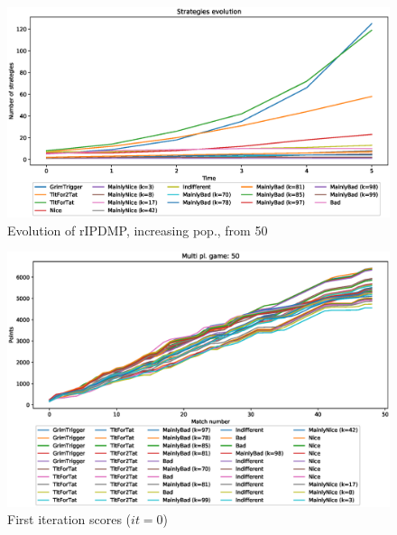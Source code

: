 \documentclass[journal,10pt,twoside]{IEEEtran}
\begin{document}
\begin{figure}[!ht]
    \centering
    \includegraphics[width=1\columnwidth]{../img/ripdmp-incr/alt1/ripdmp-evolution-increasing-pop-50}
    \caption{Evolution of rIPDMP, increasing pop., from 50}
    \label{fig:incrR}
\end{figure}

\begin{figure}[!ht]
    \centering
    \includegraphics[width=1\columnwidth]{../img/ripdmp-incr/alt1/ripdmp-scores-increasing-pop-50-r0}
    \caption{First iteration scores ($it=0$)}
    \label{fig:incrFI}
\end{figure}

\end{document}
